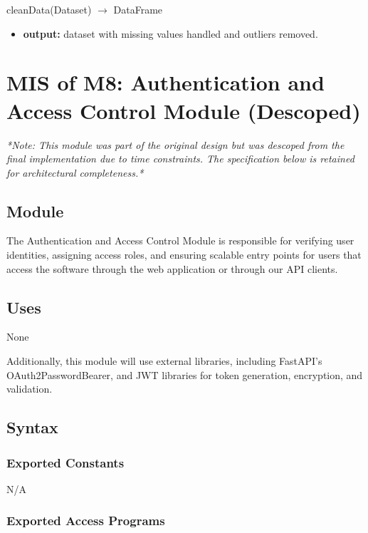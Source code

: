 \documentclass[12pt, titlepage]{article}
\begin{document}
\noindent cleanData(Dataset) $\rightarrow$ DataFrame  
\begin{itemize}
    \item \textbf{output:} dataset with missing values handled and outliers removed.
\end{itemize}


\newpage

\section{MIS of M8: Authentication and Access Control Module (Descoped)} \label{Module 8}

\textit{*Note: This module was part of the original design but was descoped from the final implementation due to time constraints. The specification below is retained for architectural completeness.*}

\subsection{Module}

\par{The Authentication and Access Control Module is responsible for verifying 
user identities, assigning access roles, and ensuring scalable entry points for users 
that access the software through the web application or through our API clients.}

\subsection{Uses}

None

\par{Additionally, this module will use external libraries, including 
FastAPI's OAuth2PasswordBearer, and JWT libraries for token generation, 
encryption, and validation.}

\subsection{Syntax}

\subsubsection{Exported Constants}

\par{N/A}

\subsubsection{Exported Access Programs}
\end{document}
